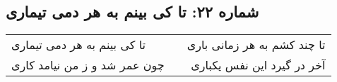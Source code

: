 \begin{center}
\section*{شماره ۲۲: تا کی بینم به هر دمی تیماری}
\label{sec:022}
\begin{longtable}{l p{0.5cm} r}
تا کی بینم به هر دمی تیماری
&&
تا چند کشم به هر زمانی باری
\\
چون عمر شد و ز من نیامد کاری
&&
آخر در گیرد این نفس یکباری
\\
\end{longtable}
\end{center}
